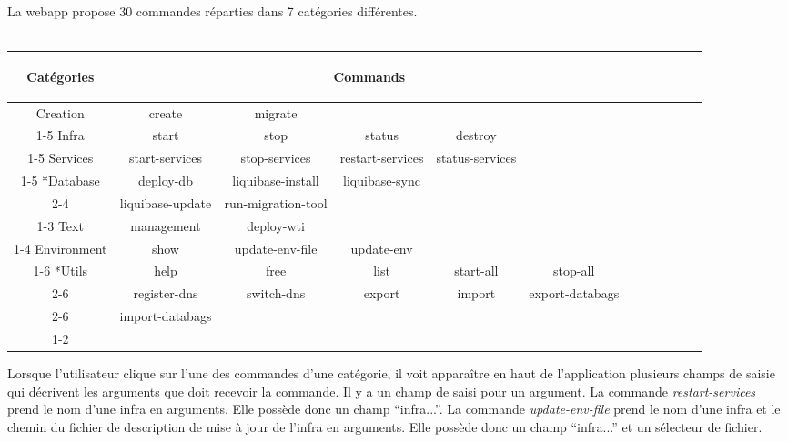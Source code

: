 La webapp propose 30 commandes réparties dans 7 catégories différentes.\\\\
\begin{tabular}{|c|c|c|c|c|c|c|c|c|c|c|c|}
  \hline
  \begin{bf}Catégories\end{bf} & \multicolumn{5}{c|}{\begin{bf}Commands\end{bf}} \\
    \hline
    Creation & create & migrate \\
    \cline{1-5}
    Infra & start & stop & status & destroy \\
    \cline{1-5}
    Services & start-services & stop-services & restart-services & status-services \\
    \cline{1-5}
    \multirow{2}*{Database} & deploy-db & liquibase-install & liquibase-sync\\
    \cline{2-4}
    & liquibase-update & run-migration-tool  \\
    \cline{1-3}
    Text & management & deploy-wti \\
    \cline{1-4}
    Environment & show & update-env-file & update-env \\
    \cline{1-6}
    \multirow{3}*{Utils} & help & free & list & start-all & stop-all \\
    \cline{2-6}
    & register-dns & switch-dns & export & import & export-databags\\
    \cline{2-6}
    & import-databags \\
    \cline{1-2}
\end{tabular}



Lorsque l'utilisateur clique sur l'une des commandes d'une catégorie, il voit
apparaître en haut de l'application plusieurs champs de saisie qui décrivent les
arguments que doit recevoir la commande.
Il y a un champ de saisi pour un argument.
La commande \textit{restart-services} prend le nom d'une infra en
arguments. Elle possède donc un champ ``infra...''.
La commande \textit{update-env-file} prend le nom d'une infra et le chemin du
fichier de description de mise à jour de l'infra en arguments. Elle possède donc
un champ ``infra...'' et un sélecteur de fichier.

